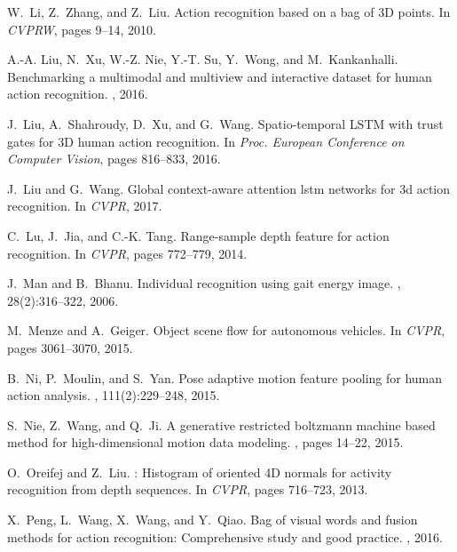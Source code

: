 \documentclass[10pt,twocolumn,letterpaper]{article}
\begin{document}
\begin{thebibliography}{10}
W.~Li, Z.~Zhang, and Z.~Liu.
\newblock Action recognition based on a bag of {3D} points.
\newblock In {\em CVPRW}, pages 9--14, 2010.

A.-A. Liu, N.~Xu, W.-Z. Nie, Y.-T. Su, Y.~Wong, and M.~Kankanhalli.
\newblock Benchmarking a multimodal and multiview and interactive dataset for
  human action recognition.
, 2016.

J.~Liu, A.~Shahroudy, D.~Xu, and G.~Wang.
\newblock Spatio-temporal {LSTM} with trust gates for {3D} human action
  recognition.
\newblock In {\em Proc. European Conference on Computer Vision}, pages
  816--833, 2016.

J.~Liu and G.~Wang.
\newblock Global context-aware attention lstm networks for 3d action
  recognition.
\newblock In {\em CVPR}, 2017.

C.~Lu, J.~Jia, and C.-K. Tang.
\newblock Range-sample depth feature for action recognition.
\newblock In {\em CVPR}, pages 772--779, 2014.

J.~Man and B.~Bhanu.
\newblock Individual recognition using gait energy image.
,
  28(2):316--322, 2006.

M.~Menze and A.~Geiger.
\newblock Object scene flow for autonomous vehicles.
\newblock In {\em CVPR}, pages 3061--3070, 2015.

B.~Ni, P.~Moulin, and S.~Yan.
\newblock Pose adaptive motion feature pooling for human action analysis.
, 111(2):229--248,
  2015.

S.~Nie, Z.~Wang, and Q.~Ji.
\newblock A generative restricted boltzmann machine based method for
  high-dimensional motion data modeling.
, pages 14--22, 2015.

O.~Oreifej and Z.~Liu.
: Histogram of oriented {4D} normals for activity recognition
  from depth sequences.
\newblock In {\em CVPR}, pages 716--723, 2013.

X.~Peng, L.~Wang, X.~Wang, and Y.~Qiao.
\newblock Bag of visual words and fusion methods for action recognition:
  Comprehensive study and good practice.
, 2016.


\end{thebibliography}
\end{document}
